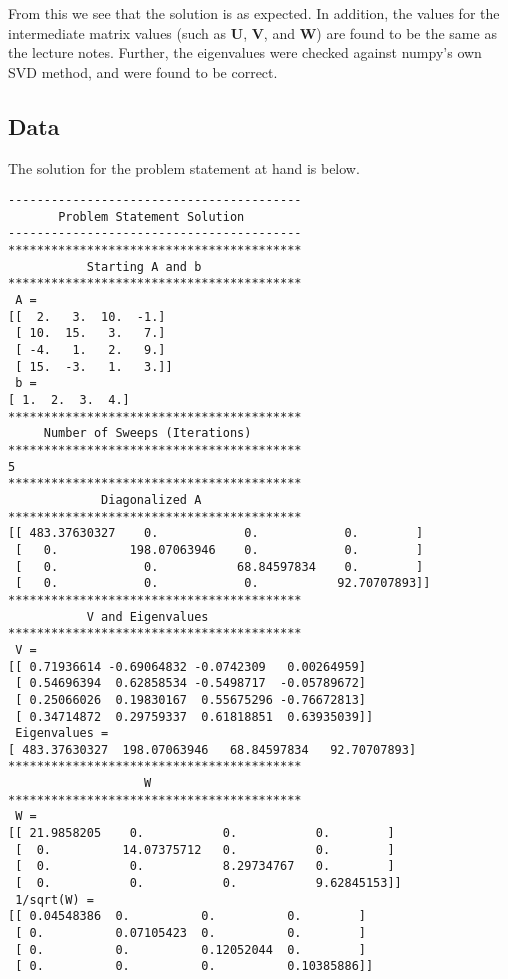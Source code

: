 \documentclass[10pt,letter]{article}
\begin{document}
From this we see that the solution is as expected. In addition, the values for the intermediate matrix values (such as \textbf{U}, \textbf{V}, and \textbf{W}) are found to be the same as the lecture notes. Further, the eigenvalues were checked against numpy's own SVD method, and were found to be correct.

\pagebreak

\subsection{Data}

The solution for the problem statement at hand is below.

\begin{verbatim}
-----------------------------------------
       Problem Statement Solution        
-----------------------------------------
*****************************************
           Starting A and b              
*****************************************
 A = 
[[  2.   3.  10.  -1.]
 [ 10.  15.   3.   7.]
 [ -4.   1.   2.   9.]
 [ 15.  -3.   1.   3.]]
 b = 
[ 1.  2.  3.  4.]
*****************************************
     Number of Sweeps (Iterations)       
*****************************************
5
*****************************************
             Diagonalized A              
*****************************************
[[ 483.37630327    0.            0.            0.        ]
 [   0.          198.07063946    0.            0.        ]
 [   0.            0.           68.84597834    0.        ]
 [   0.            0.            0.           92.70707893]]
*****************************************
           V and Eigenvalues             
*****************************************
 V = 
[[ 0.71936614 -0.69064832 -0.0742309   0.00264959]
 [ 0.54696394  0.62858534 -0.5498717  -0.05789672]
 [ 0.25066026  0.19830167  0.55675296 -0.76672813]
 [ 0.34714872  0.29759337  0.61818851  0.63935039]]
 Eigenvalues = 
[ 483.37630327  198.07063946   68.84597834   92.70707893]
*****************************************
                   W                     
*****************************************
 W = 
[[ 21.9858205    0.           0.           0.        ]
 [  0.          14.07375712   0.           0.        ]
 [  0.           0.           8.29734767   0.        ]
 [  0.           0.           0.           9.62845153]]
 1/sqrt(W) = 
[[ 0.04548386  0.          0.          0.        ]
 [ 0.          0.07105423  0.          0.        ]
 [ 0.          0.          0.12052044  0.        ]
 [ 0.          0.          0.          0.10385886]]

\end{verbatim}
\end{document}
